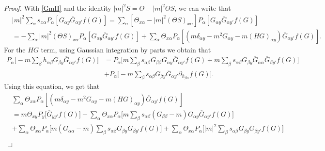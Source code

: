 \documentclass{article}
\newcommand{\1}{\mathds{1}}
\numberwithin{equation}{section}
\newcommand{\al}{\alpha}
\theoremstyle{plain} %
\theoremstyle{remark}
\begin{document}
\begin{proof}
With \eqref{GmH} and the identity $|m|^2 S= \Theta - |m|^2  \Theta S$, we can write that
\begin{align}
 & |m|^2 \sum_{\al}s_{x\al} P_\al\left[G_{\al y}  \overline G_{\al y'}  f(G)\right]  =   \sum_\al \left[ \Theta_{x\al} - |m|^2 (\Theta S)_{x\al}\right] P_\al\left[G_{\al y} \overline G_{\al y'} f(G)\right] \label{GGfH}\\
& = - \sum_\al  |m|^2 (\Theta S)_{x\al} P_\al\left[G_{\al y} \overline G_{\al y'} f(G)\right] +\sum_\al  \Theta_{x\al} P_\al\left[ (m\delta_{\al y} -m^2G_{\al y} - m (HG)_{\al y}) \overline G_{\al y'} f(G)\right].\nonumber
\end{align}
For the $ HG $ term, using Gaussian integration by parts we obtain that
\begin{align*}
   P_\al\bigg[ -m \sum_\beta h_{\al \beta}G_{\beta y} \overline G_{\al y'} f(G)\bigg] &= P_\al\bigg[ m \sum_\beta  s_{\al \beta}G_{\beta \beta} G_{\al y} \overline G_{\al y'} f(G) + m \sum_\beta s_{\al\beta} G_{\beta y} \overline G_{\al\al } \overline G_{\beta y'}  f(G)\bigg] \\
  &+   P_\al\bigg[ - m \sum_\beta s_{\al\beta}G_{\beta y} \overline G_{\al y'} \partial_{ h_{ \beta \al}}f(G)\bigg].
\end{align*}
Using this equation, we get that
\begin{align*}
& \sum_\al  \Theta_{x\al} P_\al\left[ (m\delta_{\al y} -m^2G_{\al y} - m (HG)_{\al y}) \overline G_{\al y'} f(G)\right]\\
& = m  \Theta_{xy}  P_y\bigg[  \overline G_{yy'} f(G)\bigg] + \sum_\al \Theta_{x\al}  P_\al\bigg[ m \sum_\beta  s_{\al\beta} (G_{\beta \beta}-m) G_{\al y} \overline G_{\al y'} f(G)\bigg] \\
&+ \sum_\al \Theta_{x\al}  P_\al\bigg[ m ( \overline G_{\al\al} -\overline m)\sum_\beta s_{\al\beta} G_{\beta y}\overline G_{\beta y'}  f(G)\bigg] +  \sum_\al \Theta_{x\al}  P_\al\bigg[ |m|^2\sum_\beta s_{\al\beta} G_{\beta y}\overline G_{\beta y'}  f(G)\bigg] \\

\end{align*}
\end{proof}
\end{document}
